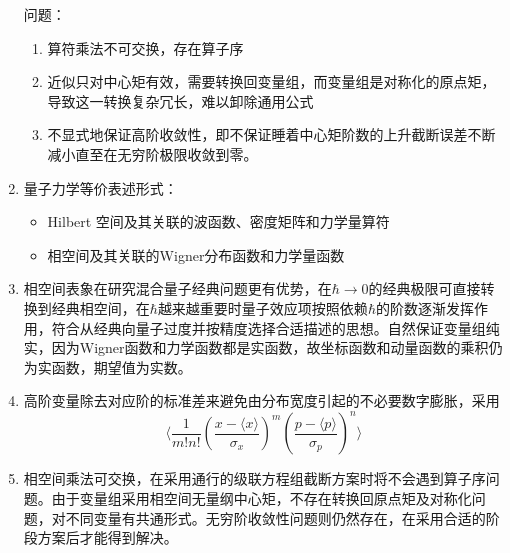 \documentclass[12pt,a4paper,openany,twoside]{book}
\numberwithin{equation}{section}
\newcommand{\mean}[1]{\langle #1 \rangle}
\begin{document}
\begin{enumerate}
  问题：
  \begin{enumerate}

    \item 算符乘法不可交换，存在算子序
    \item 近似只对中心矩有效，需要转换回变量组，而变量组是对称化的原点矩，导致这一转换复杂冗长，难以卸除通用公式

    \item 不显式地保证高阶收敛性，即不保证睡着中心矩阶数的上升截断误差不断减小直至在无穷阶极限收敛到零。

  \end{enumerate}


  \item 量子力学等价表述形式：
  \begin{itemize}
    \item Hilbert 空间及其关联的波函数、密度矩阵和力学量算符
    \item 相空间及其关联的Wigner分布函数和力学量函数
  \end{itemize}

  \item 相空间表象在研究混合量子经典问题更有优势，在$\hbar \rightarrow 0$的经典极限可直接转换到经典相空间，在$\hbar$越来越重要时量子效应项按照依赖$\hbar$的阶数逐渐发挥作用，符合从经典向量子过度并按精度选择合适描述的思想。自然保证变量组纯实，因为Wigner函数和力学函数都是实函数，故坐标函数和动量函数的乘积仍为实函数，期望值为实数。

  \item 高阶变量除去对应阶的标准差来避免由分布宽度引起的不必要数字膨胀，采用
  \begin{equation}
    \mean{\frac{1}{m!n!}\left(\frac{x-\mean{x}}{\sigma_x}\right)^m\left(\frac{p-\mean{p}}{\sigma_p}\right)^n}
    \end{equation}

  \item 相空间乘法可交换，在采用通行的级联方程组截断方案时将不会遇到算子序问题。由于变量组采用相空间无量纲中心矩，不存在转换回原点矩及对称化问题，对不同变量有共通形式。无穷阶收敛性问题则仍然存在，在采用合适的阶段方案后才能得到解决。  
\end{enumerate}
\end{document}
